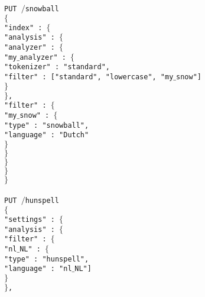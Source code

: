 \noindent\texttt{PUT $/$snowball} \\
\texttt{$\{$}\\
\indent \texttt{"index" : $\{$}\\
\indent \indent \texttt{"analysis" : $\{$}\\
\indent \indent \indent \texttt{"analyzer" : $\{$}\\
\indent \indent \indent \indent \texttt{"my$\_$analyzer" : $\{$}\\
\indent \indent \indent \indent \indent \texttt{"tokenizer" : "standard",}\\
\indent \indent \indent \indent \indent \texttt{"filter" : ["standard", "lowercase", "my$\_$snow"]}\\
\indent \indent \indent \indent \texttt{$\}$}\\
\indent \indent \indent \texttt{$\}$,}\\
\indent \indent \indent \texttt{"filter" : $\{$}\\
\indent \indent \indent \indent \texttt{"my$\_$snow" : $\{$}\\
\indent \indent \indent \indent \indent \texttt{"type" : "snowball",}\\
\indent \indent \indent \indent \indent \texttt{"language" : "Dutch"}\\
\indent \indent \indent \indent \texttt{$\}$}\\
\indent \indent \indent \texttt{$\}$}\\
\indent \indent \texttt{$\}$}\\
\indent \texttt{$\}$}\\
\texttt{$\}$}\\
\\
\noindent\texttt{PUT $/$hunspell} \\
\texttt{$\{$}\\
\indent \texttt{"settings" : $\{$}\\
\indent \indent \texttt{"analysis" : $\{$}\\
\indent \indent \indent \texttt{"filter" : $\{$}\\
\indent \indent \indent \indent \texttt{"nl$\_$NL" : $\{$}\\
\indent \indent \indent \indent \indent \texttt{"type" : "hunspell",}\\
\indent \indent \indent \indent \indent \texttt{"language" : "nl$\_$NL"]}\\
\indent \indent \indent \indent \texttt{$\}$}\\
\indent \indent \indent \texttt{$\}$,}\\
